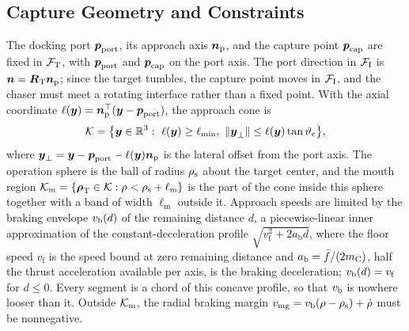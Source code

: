 \subsection{Capture Geometry and Constraints}\label{sec:constraints}

The docking port $\boldsymbol{p}_{\mathrm{port}}$, its approach axis $\boldsymbol{n}_{\mathrm{p}}$, and the capture point $\boldsymbol{p}_{\mathrm{cap}}$ are fixed in $\mathcal{F}_{\mathrm{T}}$, with $\boldsymbol{p}_{\mathrm{port}}$ and $\boldsymbol{p}_{\mathrm{cap}}$ on the port axis. The port direction in $\mathcal{F}_{\mathrm{I}}$ is $\boldsymbol{n}=\boldsymbol{R}_{\mathrm{T}}\boldsymbol{n}_{\mathrm{p}}$; since the target tumbles, the capture point moves in $\mathcal{F}_{\mathrm{I}}$, and the chaser must meet a rotating interface rather than a fixed point. With the axial coordinate $\ell(\boldsymbol{y})=\boldsymbol{n}_{\mathrm{p}}^{\top}(\boldsymbol{y}-\boldsymbol{p}_{\mathrm{port}})$, the approach cone is
\begin{equation}\label{eq:cone}
\Kset=\bigl\{\vect{y}\in\R^{3}:\ \ell(\vect{y})\ge\ell_{\min},\ \norm{\vect{y}_{\perp}}\le\ell(\vect{y})\tan\vartheta_{\mathrm{c}}\bigr\},
\end{equation}
where $\boldsymbol{y}_{\perp}=\boldsymbol{y}-\boldsymbol{p}_{\mathrm{port}}-\ell(\boldsymbol{y})\boldsymbol{n}_{\mathrm{p}}$ is the lateral offset from the port axis. The operation sphere is the ball of radius $\rho_{\mathrm{s}}$ about the target center, and the mouth region $\mathcal{K}_{\mathrm{m}}=\{\boldsymbol{\rho}_{\mathrm{T}}\in\mathcal{K}:\rho<\rho_{\mathrm{s}}+\ell_{\mathrm{m}}\}$ is the part of the cone inside this sphere together with a band of width $\ell_{\mathrm{m}}$ outside it. Approach speeds are limited by the braking envelope $v_{\mathrm{b}}(d)$ of the remaining distance $d$, a piecewise-linear inner approximation of the constant-deceleration profile $\sqrt{v_{\mathrm{f}}^{2}+2a_{\mathrm{b}}d}$, where the floor speed $v_{\mathrm{f}}$ is the speed bound at zero remaining distance and $a_{\mathrm{b}}=\bar f/(2m_{\mathrm{C}})$, half the thrust acceleration available per axis, is the braking deceleration; $v_{\mathrm{b}}(d)=v_{\mathrm{f}}$ for $d\le0$. Every segment is a chord of this concave profile, so that $v_{\mathrm{b}}$ is nowhere looser than it. Outside $\mathcal{K}_{\mathrm{m}}$, the radial braking margin $v_{\mathrm{mg}}=v_{\mathrm{b}}(\rho-\rho_{\mathrm{s}})+\dot\rho$ must be nonnegative.

